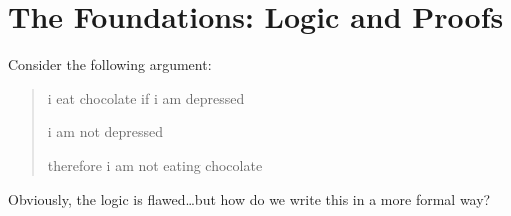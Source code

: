 \documentclass[../main.tex]{subfiles}
\begin{document}





\section{The Foundations: Logic and Proofs}

Consider the following argument:
\begin{quotation}
    i eat chocolate if i am depressed

    i am not depressed

    therefore i am not eating chocolate
\end{quotation}
Obviously, the logic is flawed\dots but how do we write this in a more formal way?
\end{document}

